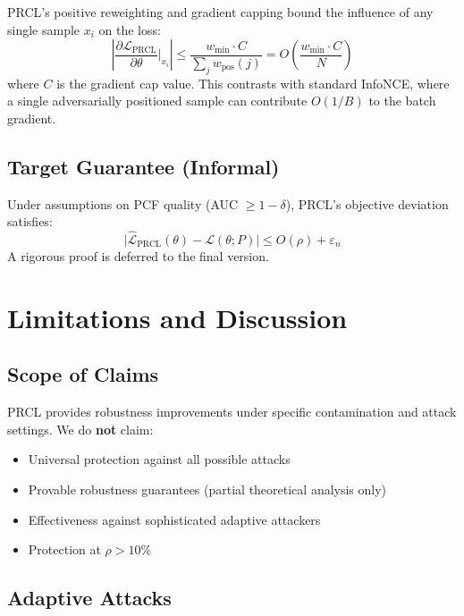 \documentclass[11pt,a4paper]{article}
\begin{document}
PRCL's positive reweighting and gradient capping bound the influence of any
single sample $x_i$ on the loss:
\begin{equation}
  \left|\frac{\partial\mathcal{L}_{\text{PRCL}}}{\partial\theta}\bigg|_{x_i}\right|
  \leq \frac{w_{\min}\cdot C}{\sum_j w_{\text{pos}}(j)}
  = O\!\left(\frac{w_{\min}\cdot C}{N}\right)
\end{equation}
where $C$ is the gradient cap value.  This contrasts with standard InfoNCE,
where a single adversarially positioned sample can contribute $O(1/B)$ to the
batch gradient.

\subsection{Target Guarantee (Informal)}

Under assumptions on PCF quality (AUC $\geq 1-\delta$), PRCL's objective
deviation satisfies:
\begin{equation}
  \bigl|\hat{\mathcal{L}}_{\text{PRCL}}(\theta)
  - \mathcal{L}(\theta;P)\bigr|
  \leq O(\rho) + \varepsilon_n
\end{equation}
A rigorous proof is deferred to the final version.


\section{Limitations and Discussion}
\label{sec:limitations}

\subsection{Scope of Claims}

PRCL provides robustness improvements under specific contamination and attack
settings.  We do \textbf{not} claim:
\begin{itemize}[nosep]
  \item Universal protection against all possible attacks
  \item Provable robustness guarantees (partial theoretical analysis only)
  \item Effectiveness against sophisticated adaptive attackers
  \item Protection at $\rho>10\%$
\end{itemize}

\subsection{Adaptive Attacks}
\end{document}
